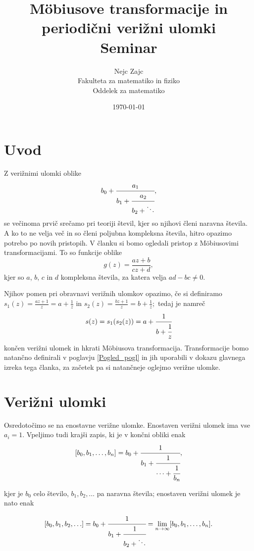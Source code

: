 \documentclass[a4paper,12pt]{article}
\title{M\"obiusove transformacije in periodični verižni ulomki \\ 
\Large Seminar}
\author{Nejc Zajc \\
Fakulteta za matematiko in fiziko \\
Oddelek za matematiko}
\date{\today}
\begin{document}


\maketitle



\section{Uvod}

Z verižnimi ulomki oblike
\[
    b_0 + \cfrac{a_1}{b_1 + \cfrac{a_2}{b_2 + \ddots}},
\]
se večinoma prvič srečamo pri teoriji števil, kjer so njihovi členi naravna števila. A ko to ne velja več in so členi poljubna kompleksna števila, hitro opazimo potrebo po novih pristopih. V članku si bomo ogledali pristop z M\"obiusovimi transformacijami. To so funkcije oblike 
\begin{equation}
\label{Mob_def}
    g(z) = \frac{az + b}{cz + d},
\end{equation}
kjer so $a$, $b$, $c$ in $d$ kompleksna števila, za katera velja $ad - bc \neq 0.$

Njihov pomen pri obravnavi verižnih ulomkov opazimo, če si definiramo $s_1(z) = \frac{az + 1}{z} = a + \frac{1}{z}$ in $s_2(z) = \frac{bz + 1}{z} = b + \frac{1}{z};$ tedaj je namreč
\[
    s(z) = s_1(s_2(z)) = a + \cfrac{1}{b + \cfrac{1}{z}}  
\]
končen verižni ulomek in hkrati M\"obiusova transformacija. Transformacije bomo natančno definirali v poglavju \ref{Pogled_pogl} in jih uporabili v dokazu glavnega izreka tega članka, za začetek pa si natančneje oglejmo verižne ulomke.


\section{Verižni ulomki}

Osredotočimo se na enostavne verižne ulomke. Enostaven verižni ulomek ima vse $a_i = 1$. Vpeljimo tudi krajši zapis, ki je v končni obliki enak
\[
    [b_0, b_1, \ldots, b_n] = b_0 + \cfrac{1}{b_1 + \cfrac{1}{\cdots + \cfrac{1}{b_n}}},
\]

kjer je $b_0$ celo število, $b_1, b_2, \ldots$ pa naravna števila; enostaven verižni ulomek je nato enak

\begin{equation}
\label{Ver_def}
    [b_0, b_1, b_2, \ldots] = b_0 + \cfrac{1}{b_1 + \cfrac{1}{b_2 + \ddots}} = \lim_{n \to \infty} [b_0, b_1, \ldots, b_n].
\end{equation}
\end{document}
